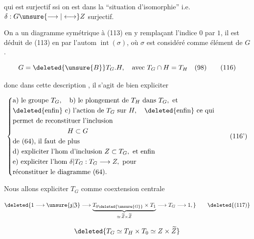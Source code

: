 

qui  est surjectif ssi on est dans la ``situation d'isomorphie'' i.e. $\delta:G\unsure{\longrightarrow|\longleftrightarrow} Z$ surjectif.


On a un diagramme symétrique à (113) en y remplaçant l'indice $0$ par $1$, il est déduit de (113) en   par l'autom $\operatorname{int}(\sigma)$, où $\sigma$ est considéré comme élément de $G$.


\[G=\deleted{\unsure{B}}T_G.H,\quad\text{avec }T_G\cap H=T_H\quad(98)\tag*{(116)}\]

donc dans cette description , il s'agit de bien expliciter

\[\left\{\begin{aligned}
&\text{a) le groupe }T_G,\quad\text{b) le plongement de }T_H\text{ dans }T_G,\text{ et}\\
&\text{\deleted{enfin} c) l'action de }T_G\text{ sur }H,\quad\text{\deleted{enfin} ce qui}\\
&\text{permet de reconstituer l'inclusion}\\
&\hspace{8em}H\subset G\\
&\text{de (64), il faut de plus}\\
&\text{d) expliciter l'hom d'inclusion } Z\subset T_G,\text{ et enfin}\\
&\text{e) expliciter l'hom }\delta|T_G:T_G\longrightarrow Z,\text{ pour}\\
&\text{réconstituer le diagramme (64).}
\end{aligned}\right.\tag*{(116')}\]

Nous allons expliciter $T_G$  comme coextension centrale

\[\deleted{1\longrightarrow\unsure{\mathfrak{z}|\mathfrak{Z}}\longrightarrow
\underbrace{T_{0\deleted{\unsure{G}}}\times T_1}_{\simeq\,\widetilde Z\times\widetilde Z}
\longrightarrow T_G\longrightarrow 1,}\tag*{\deleted{(117)}}\]

 

\[\deleted{T_G\simeq T_H\times T_0\simeq Z\times\widetilde Z}\]

